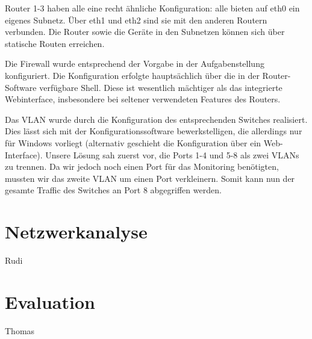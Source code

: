 \documentclass[10pt,a4paper]{article}
\begin{document}
	Router 1-3 haben alle eine recht ähnliche Konfiguration: alle bieten auf eth0 ein eigenes Subnetz. Über eth1 und eth2 sind sie mit den anderen Routern verbunden. Die Router sowie die Geräte in den Subnetzen können sich über statische Routen erreichen. \par 
	
	Die Firewall wurde entsprechend der Vorgabe in der Aufgabenstellung konfiguriert. Die Konfiguration erfolgte hauptsächlich über die in der Router-Software verfügbare Shell. Diese ist wesentlich mächtiger als das integrierte Webinterface, insbesondere bei seltener verwendeten Features des Routers. \par 
	
	Das VLAN wurde durch die Konfiguration des entsprechenden Switches realisiert. Dies lässt sich mit der Konfigurationssoftware bewerkstelligen, die allerdings nur für Windows vorliegt (alternativ geschieht die Konfiguration über ein Web-Interface). Unsere Lösung sah zuerst vor,  die Ports 1-4 und 5-8 als zwei VLANs zu trennen. Da wir jedoch noch einen Port für das Monitoring benötigten, mussten wir das zweite VLAN um einen Port verkleinern. Somit kann nun der gesamte Traffic des Switches an Port 8 abgegriffen werden. \par 
	
	
	\section{Netzwerkanalyse}Rudi
	
	
	\section{Evaluation}Thomas
\end{document}
